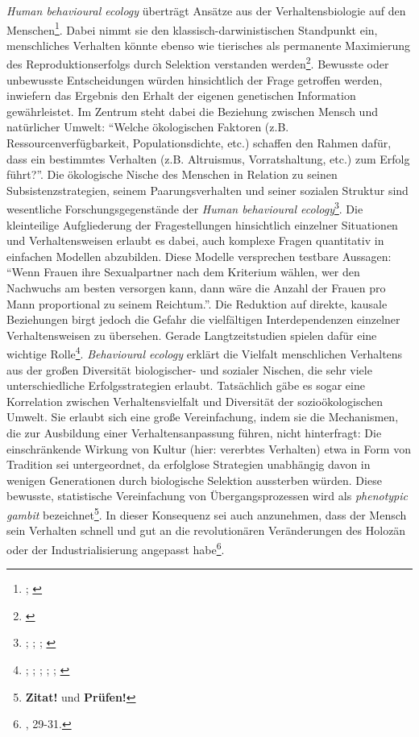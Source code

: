 \documentclass[openany,twoside,twocolumn]{book}
\let\rmarkdownfootnote\footnote%
\def\footnote{\protect\rmarkdownfootnote}
\begin{document}
\emph{Human behavioural ecology} überträgt Ansätze aus der
Verhaltensbiologie auf den Menschen\footnote{\textcite{smith_cultural_1992};
  \textcite{winterhalder_analyzing_2000}}. Dabei nimmt sie den
klassisch-darwinistischen Standpunkt ein, menschliches Verhalten könnte
ebenso wie tierisches als permanente Maximierung des
Reproduktionserfolgs durch Selektion verstanden werden\footnote{\textcite{creanza_cultural_2017}}.
Bewusste oder unbewusste Entscheidungen würden hinsichtlich der Frage
getroffen werden, inwiefern das Ergebnis den Erhalt der eigenen
genetischen Information gewährleistet. Im Zentrum steht dabei die
Beziehung zwischen Mensch und natürlicher Umwelt: ``Welche ökologischen
Faktoren (z.B. Ressourcenverfügbarkeit, Populationsdichte, etc.)
schaffen den Rahmen dafür, dass ein bestimmtes Verhalten (z.B.
Altruismus, Vorratshaltung, etc.) zum Erfolg führt?''. Die ökologische
Nische des Menschen in Relation zu seinen Subsistenzstrategien, seinem
Paarungsverhalten und seiner sozialen Struktur sind wesentliche
Forschungsgegenstände der \emph{Human behavioural ecology}\footnote{\textcite{henrich_search_2001};
  \textcite{kaplan_theory_2000}; \textcite{voland_evolutionary_1998};
  \textcite{winterhalder_risk-senstive_1999}}. Die kleinteilige
Aufgliederung der Fragestellungen hinsichtlich einzelner Situationen und
Verhaltensweisen erlaubt es dabei, auch komplexe Fragen quantitativ in
einfachen Modellen abzubilden. Diese Modelle versprechen testbare
Aussagen: ``Wenn Frauen ihre Sexualpartner nach dem Kriterium wählen,
wer den Nachwuchs am besten versorgen kann, dann wäre die Anzahl der
Frauen pro Mann proportional zu seinem Reichtum.''. Die Reduktion auf
direkte, kausale Beziehungen birgt jedoch die Gefahr die vielfältigen
Interdependenzen einzelner Verhaltensweisen zu übersehen. Gerade
Langtzeitstudien spielen dafür eine wichtige Rolle\footnote{\textcite{belovsky_optimal_1988};
  \textcite{broughton_widening_1997}; \textcite{low_population_1993};
  \textcite{stiner_paleolithic_1999}; \textcite{stiner_tortoise_2000};
  \textcite{winterhalder_population_1988}}. \emph{Behavioural ecology}
erklärt die Vielfalt menschlichen Verhaltens aus der großen Diversität
biologischer- und sozialer Nischen, die sehr viele unterschiedliche
Erfolgsstrategien erlaubt. Tatsächlich gäbe es sogar eine Korrelation
zwischen Verhaltensvielfalt und Diversität der sozioökologischen Umwelt.
Sie erlaubt sich eine große Vereinfachung, indem sie die Mechanismen,
die zur Ausbildung einer Verhaltensanpassung führen, nicht hinterfragt:
Die einschränkende Wirkung von Kultur (hier: vererbtes Verhalten) etwa
in Form von Tradition sei untergeordnet, da erfolglose Strategien
unabhängig davon in wenigen Generationen durch biologische Selektion
aussterben würden. Diese bewusste, statistische Vereinfachung von
Übergangsprozessen wird als \emph{phenotypic gambit}
bezeichnet\footnote{\textbf{Zitat!} und \textbf{Prüfen!}}. In dieser
Konsequenz sei auch anzunehmen, dass der Mensch sein Verhalten schnell
und gut an die revolutionären Veränderungen des Holozän oder der
Industrialisierung angepasst habe\footnote{\textcite{SmithThreestylesevolutionary2000},
  29-31.}.
\end{document}
